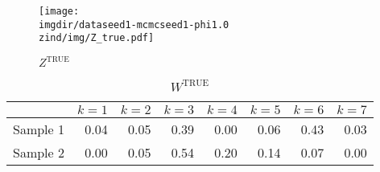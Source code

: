 \documentclass[10pt]{article} %
\def\true{\text{TRUE}}
\def\imgdir{../../../results/test-sim-6-7-18}
\def\zind{-Zind3}
\begin{document}
\begin{figure}[H]
  \begin{center}  %
    \texttt{[image: \\imgdir/dataseed1-mcmcseed1-phi1.0\\zind/img/Z\_true.pdf]}
  \end{center}
  \caption{$Z^\true$}
  \label{fig:Z-true}
\end{figure}

\begin{table}[ht]
  \centering
  \begin{tabular}{rrrrrrrr}
    \hline
    & $k=1$ & $k=2$ & $k=3$ & $k=4$ & $k=5$ & $k=6$ & $k=7$ \\
    \hline
    Sample 1 & 0.04 & 0.05 & 0.39 & 0.00 & 0.06 & 0.43 & 0.03 \\
    Sample 2 & 0.00 & 0.05 & 0.54 & 0.20 & 0.14 & 0.07 & 0.00 \\
    \hline
  \end{tabular}
  \caption{$W^\true$}
  \label{tab:W-true}
\end{table}
\end{document}
